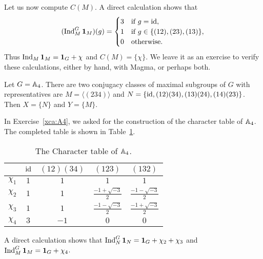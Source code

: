 \begin{example}
    Let us now compute $C(M)$. A direct calculation shows that 
    \[
    (\operatorname{Ind}_{M}^G\mathbf{1}_{M})(g)=\begin{cases}
        3 & \text{if $g=\operatorname{id}$},\\
        1 & \text{if $g\in\{(12),(23),(13)\}$},\\
        0 & \text{otherwise.}
    \end{cases}
    \]
    Thus $\operatorname{Ind}_{M}\mathbf{1}_{M}=\mathbf{1}_G+\chi$ and $C(M)=\{\chi\}$. 
    We leave it as an exercise to verify these calculations, either by 
    hand, with Magma, or perhaps both.
\end{example}

\begin{example}
    Let $G=\mathbb{A}_4$. There are two conjugacy classes of maximal subgroups of $G$ with representatives
    are $M=\langle (234)\rangle$ and $N=\{\operatorname{id},(12)(34),(13)(24),(14)(23)\}$. Then 
    $X=\{N\}$ and $Y=\{M\}$. 

    In Exercise~\ref{xca:A4}, we asked for the construction of the character table of \( \mathbb{A}_4 \). The completed table is shown in Table~\ref{tab:A4}.

    \begin{table}[h]
        \centering\makegapedcells
        \caption{The Character table of $\mathbb{A}_4$.}
        \label{tab:A4}
        \begin{tabular}{|c|cccc|}
             \hline
             & $\operatorname{id}$ & $(12)(34)$ & $(123)$ & $(132)$\\
             \hline
             $\chi_1$ & $1$ & $1$ & $1$ & $1$\\
             $\chi_2$ & $1$ & $1$ & $\frac{-1+\sqrt{-3}}{2}$ & $\frac{-1-\sqrt{-3}}{2}$\\
             $\chi_3$ & $1$ & $1$ & $\frac{-1-\sqrt{-3}}{2}$ & $\frac{-1+\sqrt{-3}}{2}$\\
             $\chi_4$ & $3$ & $-1$ & $0$ & $0$\\
             \hline
        \end{tabular}
    \end{table}

    
    A direct calculation shows that
    $\operatorname{Ind}_N^G\mathbf{1}_N=\mathbf{1}_G+\chi_2+\chi_3$ and 
    $\operatorname{Ind}_M^G\mathbf{1}_M=\mathbf{1}_G+\chi_4$. 
\end{example}

